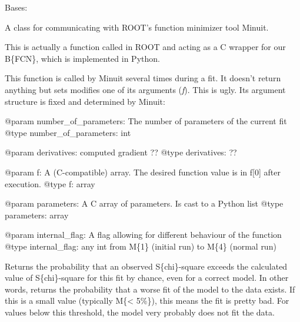 \documentclass[letterpaper,10pt,english]{sphinxmanual}
\begin{document}
\begin{fulllineitems}
\label{api/kafe:kafe.minuit.Minuit}
Bases: 

A class for communicating with ROOT's function minimizer tool Minuit.

\begin{fulllineitems}
\label{api/kafe:kafe.minuit.Minuit.FCN_wrapper}
This is actually a function called in ROOT and acting as a C wrapper 
for our B\{FCN\}, which is implemented in Python.

This function is called by Minuit several times during a fit. It doesn't return
anything but sets modifies one of its arguments (\emph{f}). This is ugly. Its argument
structure is fixed and determined by Minuit:

@param number\_of\_parameters: The number of parameters of the current fit
@type number\_of\_parameters: int

@param derivatives: computed gradient ??
@type derivatives: ??

@param f: A (C-compatible) array. The desired function value is in f{[}0{]} after execution.
@type f: array

@param parameters: A C array of parameters. Is cast to a Python list
@type parameters: array

@param internal\_flag: A flag allowing for different behaviour of the function
@type internal\_flag: any int from M\{1\} (initial run) to M\{4\} (normal run)

\end{fulllineitems}


\begin{fulllineitems}
\label{api/kafe:kafe.minuit.Minuit.get_chi2_probability}
Returns the probability that an observed S\{chi\}-square exceeds
the calculated value of S\{chi\}-square for this fit by chance, even for a correct model.
In other words, returns the probability that a worse fit of the model to the data exists.
If this is a small value (typically M\{\textless{} 5\%\}), this means the fit is pretty bad. For
values below this threshold, the model very probably does not fit the data.


\end{fulllineitems}
\end{fulllineitems}
\end{document}
